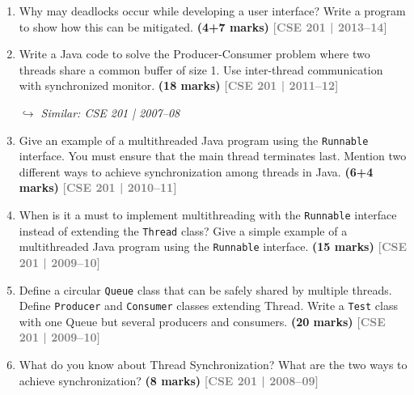 \documentclass[12pt,a3paper]{article}
\newcommand{\yr}[1]{\hfill\textcolor{gray}{\small\textbf{[#1]}}}
\newcommand{\mk}[1]{\textcolor{orange!70!black}{\small\textbf{(#1 marks)}}}
\newcommand{\variant}[1]{\par\vspace{1pt}\textcolor{blue!50!black}%
  {\footnotesize\textit{$\hookrightarrow$ Similar: #1}}}
\begin{document}
\begin{enumerate}
\item Why may deadlocks occur while developing a user interface? Write a program to show how this can be mitigated. \mk{4+7}
\yr{CSE 201 | 2013--14}




\item Write a Java code to solve the Producer-Consumer problem where two threads share a common buffer of size 1. Use inter-thread communication with synchronized monitor. \mk{18}
\yr{CSE 201 | 2011--12}
\variant{CSE 201 | 2007--08}




\item Give an example of a multithreaded Java program using the \texttt{Runnable} interface. You must ensure that the main thread terminates last. Mention two different ways to achieve synchronization among threads in Java. \mk{6+4}
\yr{CSE 201 | 2010--11}




\item When is it a must to implement multithreading with the \texttt{Runnable} interface instead of extending the \texttt{Thread} class? Give a simple example of a multithreaded Java program using the \texttt{Runnable} interface. \mk{15}
\yr{CSE 201 | 2009--10}




\item Define a circular \texttt{Queue} class that can be safely shared by multiple threads. Define \texttt{Producer} and \texttt{Consumer} classes extending Thread. Write a \texttt{Test} class with one Queue but several producers and consumers. \mk{20}
\yr{CSE 201 | 2009--10}




\item What do you know about Thread Synchronization? What are the two ways to achieve synchronization? \mk{8}
\yr{CSE 201 | 2008--09}





\end{enumerate}
\newpage
\end{document}
